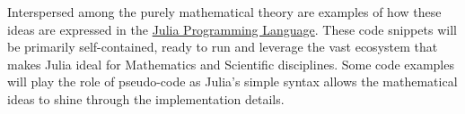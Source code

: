 Interspersed among the purely mathematical theory are examples of how these
ideas are expressed in the \href{https://julialang.org/}{Julia Programming
Language}. These code snippets will be primarily self-contained, ready to run
and leverage the vast ecosystem that makes Julia ideal for Mathematics and
Scientific disciplines. Some code examples will play the role of pseudo-code as
Julia's simple syntax allows the mathematical ideas to shine through the
implementation details.